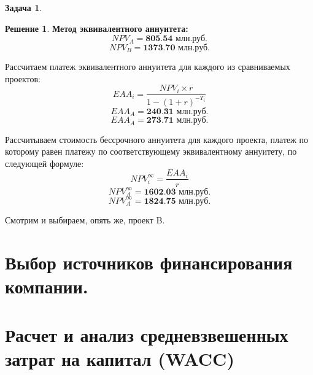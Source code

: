 \documentclass[a4paper, 14pt]{article}
\theoremstyle{plain} %
\theoremstyle{definition} %
\newtheorem*{solution}{Решение}
\newtheorem{problem}{Задача}[subsection]
\theoremstyle{remark} %
\begin{document}
\begin{problem}
\begin{solution}
\vspace{1em}
\textbf{Метод эквивалентного аннуитета:}
	\[NPV_{A} = \textbf{805.54 млн.руб.} \]
	\[NPV_{B} = \textbf{1373.70 млн.руб.} \]

Рассчитаем платеж эквивалентного аннуитета для каждого из сравниваемых проектов:
	\[EAA_{i} = \frac{NPV_{i} \times r}{1-(1+r)^{-T_{i}}}\]
	\[EAA_{A} = \textbf{240.31 млн.руб.}\]
	\[EAA_{A} = \textbf{273.71 млн.руб.}\]

Рассчитываем стоимость бессрочного аннуитета для каждого проекта, платеж по которому равен платежу по соответствующему эквивалентному аннуитету, по следующей формуле:
	\[NPV_{i}^{\infty} = \frac{EAA_{i}}{r}\]
	\[NPV_{A}^{\infty} = \textbf{1602.03 млн.руб.}\]
	\[NPV_{A}^{\infty} = \textbf{1824.75 млн.руб.}\]

Смотрим и выбираем, опять же, проект B.
	\end{solution}
\end{problem}

\section{Выбор источников финансирования компании.}

\section{Расчет и анализ средневзвешенных затрат на капитал (WACC)}
\end{document}
